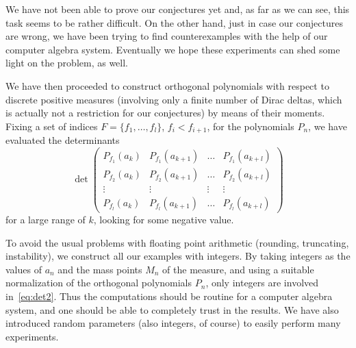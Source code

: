\documentclass[12pt]{article}
\begin{document}
We have not been able to prove our conjectures yet and, as far as we can see, this task seems to be rather difficult. On the other hand, just in case our conjectures are wrong, we have been trying to find counterexamples with the help of our computer algebra system. Eventually we hope these experiments can shed some light on the problem, as well.

We have then proceeded to construct orthogonal polynomials with respect to discrete positive measures (involving only a finite number of Dirac deltas, which is actually not a restriction for our conjectures) by means of their moments. Fixing a set of indices $F=\{f_1,\ldots , f_{l}\}$, $f_i<f_{i+1}$, for the polynomials $P_n$, we have evaluated
the determinants
\begin{equation}
\label{eq:det2}
\det
\begin{pmatrix}
   P_{f_1}(a_k) & P_{f_1}(a_{k+1})& \dots & P_{f_1}(a_{k+l}) \\
   P_{f_2}(a_k) & P_{f_2}(a_{k+1})& \dots & P_{f_2}(a_{k+l}) \\
   \vdots & \vdots& \vdots & \vdots \\
   P_{f_{l}}(a_k) & P_{f_{l}}(a_{k+1})& \dots & P_{f_{l}}(a_{k+l})
\end{pmatrix}
\end{equation}
for a large range of $k$, looking for some negative value.

To avoid the usual problems with floating point arithmetic (rounding, truncating, instability), we construct all our examples with integers. By taking integers as the values of $a_n$ and the mass points $M_n$ of the measure, and using a suitable normalization of the orthogonal polynomials $P_n$, only integers are involved in~\eqref{eq:det2}. Thus the computations should be routine for a computer algebra system, and one should be able to completely trust in the results. We have also introduced random parameters (also integers, of course) to easily perform many experiments.

\end{document}
